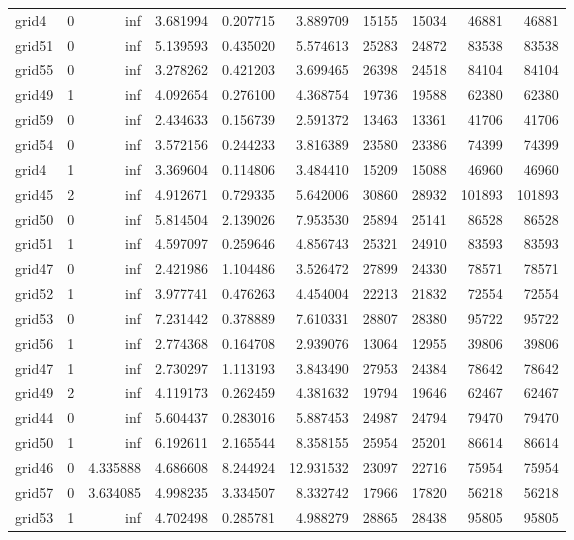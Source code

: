 \begin{longtable}{|l|r|r|r|r|r|r|r|r|r|}
grid4 & 0 & inf & 3.681994 & 0.207715 & 3.889709 & 15155 & 15034 & 46881 & 46881 \\
grid51 & 0 & inf & 5.139593 & 0.435020 & 5.574613 & 25283 & 24872 & 83538 & 83538 \\
grid55 & 0 & inf & 3.278262 & 0.421203 & 3.699465 & 26398 & 24518 & 84104 & 84104 \\
grid49 & 1 & inf & 4.092654 & 0.276100 & 4.368754 & 19736 & 19588 & 62380 & 62380 \\
grid59 & 0 & inf & 2.434633 & 0.156739 & 2.591372 & 13463 & 13361 & 41706 & 41706 \\
grid54 & 0 & inf & 3.572156 & 0.244233 & 3.816389 & 23580 & 23386 & 74399 & 74399 \\
grid4 & 1 & inf & 3.369604 & 0.114806 & 3.484410 & 15209 & 15088 & 46960 & 46960 \\
grid45 & 2 & inf & 4.912671 & 0.729335 & 5.642006 & 30860 & 28932 & 101893 & 101893 \\
grid50 & 0 & inf & 5.814504 & 2.139026 & 7.953530 & 25894 & 25141 & 86528 & 86528 \\
grid51 & 1 & inf & 4.597097 & 0.259646 & 4.856743 & 25321 & 24910 & 83593 & 83593 \\
grid47 & 0 & inf & 2.421986 & 1.104486 & 3.526472 & 27899 & 24330 & 78571 & 78571 \\
grid52 & 1 & inf & 3.977741 & 0.476263 & 4.454004 & 22213 & 21832 & 72554 & 72554 \\
grid53 & 0 & inf & 7.231442 & 0.378889 & 7.610331 & 28807 & 28380 & 95722 & 95722 \\
grid56 & 1 & inf & 2.774368 & 0.164708 & 2.939076 & 13064 & 12955 & 39806 & 39806 \\
grid47 & 1 & inf & 2.730297 & 1.113193 & 3.843490 & 27953 & 24384 & 78642 & 78642 \\
grid49 & 2 & inf & 4.119173 & 0.262459 & 4.381632 & 19794 & 19646 & 62467 & 62467 \\
grid44 & 0 & inf & 5.604437 & 0.283016 & 5.887453 & 24987 & 24794 & 79470 & 79470 \\
grid50 & 1 & inf & 6.192611 & 2.165544 & 8.358155 & 25954 & 25201 & 86614 & 86614 \\
grid46 & 0 & 4.335888 & 4.686608 & 8.244924 & 12.931532 & 23097 & 22716 & 75954 & 75954 \\
grid57 & 0 & 3.634085 & 4.998235 & 3.334507 & 8.332742 & 17966 & 17820 & 56218 & 56218 \\
grid53 & 1 & inf & 4.702498 & 0.285781 & 4.988279 & 28865 & 28438 & 95805 & 95805 \\

\end{longtable}
